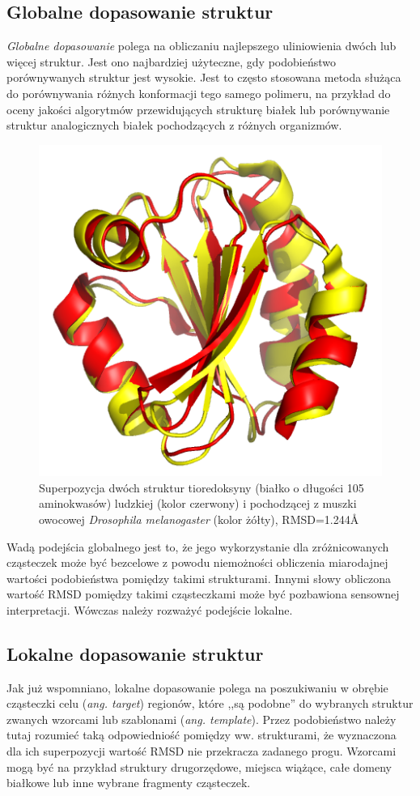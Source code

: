 \documentclass[licencjacka]{pracamgr}
\begin{document}
\subsection{Globalne dopasowanie struktur} 

\textit{Globalne dopasowanie} polega na obliczaniu najlepszego uliniowienia dwóch lub więcej struktur. Jest ono najbardziej użyteczne, gdy podobieństwo porównywanych struktur jest wysokie. Jest to często stosowana metoda służąca do porównywania różnych konformacji tego samego polimeru, na przykład do oceny jakości algorytmów przewidujących strukturę białek lub porównywanie struktur analogicznych białek pochodzących z różnych organizmów. 

\begin{figure}[H]
\centering
\includegraphics[scale=0.7]{global_superposition}
\caption{Superpozycja dwóch struktur tioredoksyny (białko o długości 105 aminokwasów) ludzkiej (kolor czerwony) i pochodzącej z muszki owocowej \textit{Drosophila melanogaster} (kolor żółty), RMSD=1.244\AA }
\end{figure}

Wadą podejścia globalnego jest to, że jego wykorzystanie dla zróżnicowanych cząsteczek może być bezcelowe z powodu niemożności obliczenia miarodajnej wartości podobieństwa pomiędzy takimi strukturami. Innymi słowy obliczona wartość RMSD pomiędzy takimi cząsteczkami może być pozbawiona sensownej interpretacji. Wówczas należy rozważyć podejście lokalne.

\subsection{Lokalne dopasowanie struktur} 
Jak już wspomniano, lokalne dopasowanie polega na poszukiwaniu w obrębie cząsteczki celu (\textit{ang. target}) regionów, które ,,są podobne'' do wybranych struktur zwanych wzorcami lub szablonami (\textit{ang. template}). Przez podobieństwo należy tutaj rozumieć taką odpowiedniość pomiędzy ww. strukturami, że wyznaczona dla ich superpozycji wartość RMSD nie przekracza zadanego progu. Wzorcami mogą być na przykład struktury drugorzędowe, miejsca wiążące, całe domeny białkowe lub inne wybrane fragmenty cząsteczek.
\end{document}
